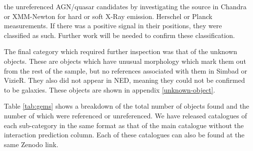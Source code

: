 {\DIFdelbegin {}\DIFdelend \DIFaddbegin {}\DIFaddend the \DIFdelbegin {}\DIFdelend unreferenced AGN/quasar \DIFdelbegin {}\DIFdelend candidates by investigating the source in Chandra or XMM-Newton for hard or soft X-Ray emission. \DIFdelbegin {}\DIFdelend \DIFaddbegin {}\textit{} \textit{} \DIFaddend Herschel or Planck measurements. If there was a positive signal in their positions, they were classified as such. Further work will be needed to confirm these classification.

The final category which required further inspection was that of the unknown objects. These are objects which have unusual morphology which mark them out from the rest of the sample, but no references associated with them in Simbad or VizieR. They also did not appear in NED, meaning they could not be confirmed to be galaxies. These objects are shown in appendix \ref{unknown-object}.

Table \ref{tab:gems} shows a breakdown of the total number of objects found and the number of which were referenced or unreferenced. We have released catalogues of each sub-category in the same format as that of the main catalogue without the interaction prediction column. Each of these catalogues can also be found at the same Zenodo link.


}
